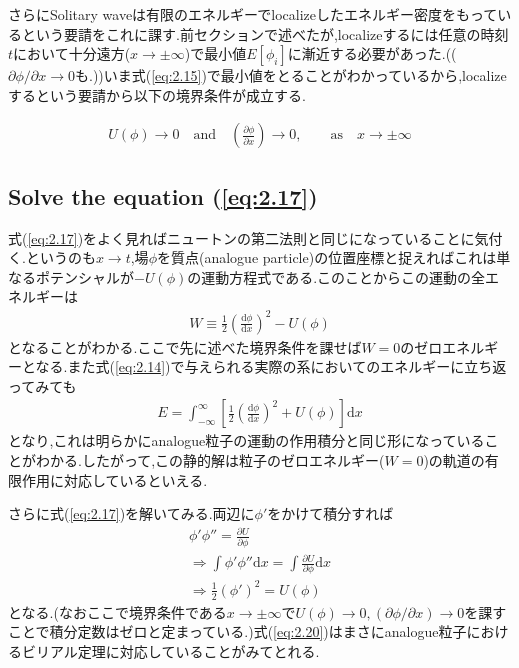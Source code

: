 \documentclass[dvipdfmx,11pt,a4paper]{jsbook}
\begin{document}
さらにSolitary waveは有限のエネルギーでlocalizeしたエネルギー密度をもっているという要請をこれに課す.前セクションで述べたが,localizeするには任意の時刻$t$において十分遠方($x\rightarrow \pm\infty$)で最小値$E[\phi_i]$に漸近する必要があった.(($\partial\phi/\partial x\rightarrow 0$も.))いま式(\ref{eq:2.15})で最小値をとることがわかっているから,localizeするという要請から以下の境界条件が成立する.
\begin{screen}
    \begin{align*}
        U(\phi)\rightarrow0 \quad \text{and} \quad \left(\frac{\partial\phi}{\partial x}\right)\rightarrow 0,\qquad \text{as}\quad x\rightarrow \pm \infty
    \end{align*}
\end{screen}

\subsection{Solve the equation (\ref{eq:2.17})}
式(\ref{eq:2.17})をよく見ればニュートンの第二法則と同じになっていることに気付く.というのも$x\rightarrow t$,場$\phi$を質点(analogue particle)の位置座標と捉えればこれは単なるポテンシャルが$-U(\phi)$の運動方程式である.このことからこの運動の全エネルギーは
\begin{align}
    W \equiv \frac{1}{2}\left(\frac{\mathrm{d} \phi}{\mathrm{d}x}\right)^{2}-U(\phi)\label{eq:2.18}
\end{align}
となることがわかる.ここで先に述べた境界条件を課せば$W=0$のゼロエネルギーとなる.また式(\ref{eq:2.14})で与えられる実際の系においてのエネルギーに立ち返ってみても
\begin{align}
    E=\int_{-\infty}^{\infty}\left[\frac{1}{2}\left(\frac{\mathrm{d}\phi}{\mathrm{d}x}\right)^2+U(\phi)\right]\mathrm{d}x
\end{align}
となり,これは明らかにanalogue粒子の運動の作用積分と同じ形になっていることがわかる.したがって,この静的解は粒子のゼロエネルギー($W=0$)の軌道の有限作用に対応しているといえる.

さらに式(\ref{eq:2.17})を解いてみる.両辺に$\phi'$をかけて積分すれば
\begin{align}
    \phi'\phi''=\frac{\partial U}{\partial\phi}\nonumber                                            \\
    \Rightarrow \int\phi'\phi''\mathrm{d}x=\int\frac{\partial U}{\partial \phi}\mathrm{d}x\nonumber \\
    \Rightarrow \frac{1}{2}\left(\phi'\right)^2=U(\phi)\label{eq:2.20}
\end{align}
となる.(なおここで境界条件である$x\rightarrow \pm \infty$で$U(\phi)\rightarrow 0, (\partial \phi/\partial x)\rightarrow 0$を課すことで積分定数はゼロと定まっている.)式(\ref{eq:2.20})はまさにanalogue粒子におけるビリアル定理に対応していることがみてとれる.
\end{document}
